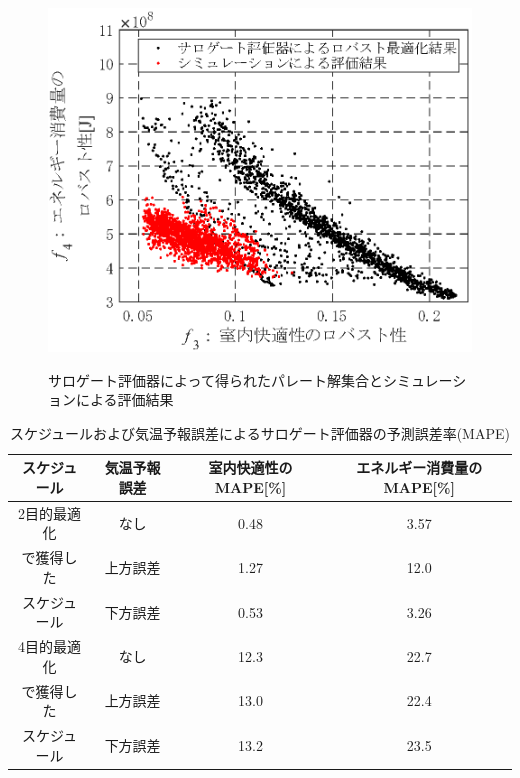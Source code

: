 \begin{figure}[htbp]
\begin{center}
\begin{minipage}{0.7\textwidth}
\begin{center}
        \includegraphics[width=1\textwidth,keepaspectratio=true]{fig/surrogate_result_pareto_robust_comp_f3f4.eps}\\\vspace{-5mm}{\small (B) $f_3$-$f_4$目的関数空間}
      \end{center}
    \end{minipage}
    \vspace{-1mm}
    \caption{サロゲート評価器によって得られたパレート解集合とシミュレーションによる評価結果}
    \label{fig::surrogate_result_pareto_robust_comp}
  \end{center}
\end{figure}

\begin{table}[t]
  \begin{center}
    \caption{スケジュールおよび気温予報誤差によるサロゲート評価器の予測誤差率(MAPE)}
    \label{tab::surrogate_predict_robust}
    \small
    \begin{tabular}{c|c|c|c}
      \hline
      スケジュール & 気温予報誤差 & 室内快適性のMAPE[\%] & エネルギー消費量のMAPE[\%] \\
      \hline \hline
      2目的最適化  & なし         & 0.48                 & 3.57                       \\
      \cline{2-4}
      で獲得した   & 上方誤差     & 1.27                 & 12.0                       \\
      \cline{2-4}
      スケジュール & 下方誤差     & 0.53                 & 3.26                       \\
      \hline
      4目的最適化  & なし         & 12.3                 & 22.7                       \\
      \cline{2-4}
      で獲得した   & 上方誤差     & 13.0                 & 22.4                       \\
      \cline{2-4}
      スケジュール & 下方誤差     & 13.2                 & 23.5                       \\
      \hline
    \end{tabular}
  \end{center}
\end{table}

